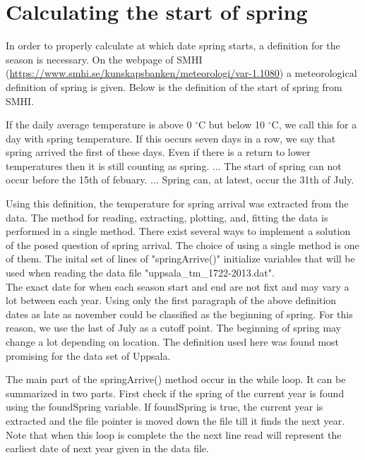 \documentclass[a4paper,12pt]{article}
\begin{document}
\section{Calculating the start of spring}
In order to properly calculate at which date spring starts, a 
definition for the season is necessary. On the webpage of SMHI 
(\url{https://www.smhi.se/kunskapsbanken/meteorologi/var-1.1080})
a meteorological definition of spring is given. Below is the 
definition of the start of spring from SMHI.

\hfill\begin{minipage}[c]{\textwidth-2cm}
	If the daily average temperature is above 0 $^\circ$C but below 10 
	$^\circ$C, we call this for a day with spring temperature. If this 
	occurs seven days in a row,	we say that spring arrived the first of 
	these days. Even if there is a return to lower temperatures then it is
	still counting as spring.
	\newline
	$\ldots$
	\newline
	The start of spring can not occur before the 15th of febuary.
	\newline
	$\ldots$
	\newline
	Spring can, at latest, occur the 31th of July.
\end{minipage}

\noindent Using this definition, the temperature for spring arrival was 
extracted from the data. The method for reading, extracting, plotting, 
and, fitting the data is performed in a single method. There exist 
several ways to implement a solution of the posed question of spring 
arrival. The choice of using a single method is one of them. The inital 
set of lines of "springArrive()" initialize variables that will be used 
when reading the data file "uppsala\_tm\_1722-2013.dat".
\\\indent
The exact date for when each season start and end are not fixt and may 
vary a lot between each year. Using only the first paragraph of the 
above definition dates as late as november could be classified as the 
beginning of spring. For this reason, we use the last of July as a 
cutoff point. The beginning of spring may change a lot depending on 
location. The definition used here was found most promising for the 
data set of Uppsala. 

The main part of the springArrive() method occur in the while loop. It 
can be summarized in two parts. First check if the spring of the 
current year is found using the foundSpring variable. If foundSpring is 
true, the current year is extracted and the file pointer is moved down 
the file till it finds the next year. Note that when this loop is 
complete the the next line read will represent the earliest date
of next year given in the data file.
\end{document}
